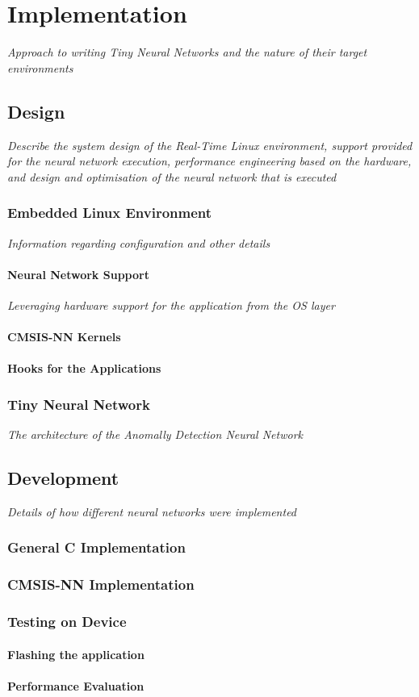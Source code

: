 \part{Implementation}

\textit{Approach to writing Tiny Neural Networks and the nature of their target environments}

\chapter{Design}
\textit{Describe the system design of the Real-Time Linux environment, support provided for the neural network execution, performance engineering based on the hardware, and design and optimisation of the neural network that is executed}

\section[Embedded Operating System]{Embedded Linux Environment}
\textit{Information regarding configuration and other details}

\subsection{Neural Network Support}
\textit{Leveraging hardware support for the application from the OS layer}

\subsection{CMSIS-NN Kernels}

\subsection{Hooks for the Applications}

\section{Tiny Neural Network}
\textit{The architecture of the Anomally Detection Neural Network}

\chapter{Development}
\textit{Details of how different neural networks were implemented}

\section{General C Implementation}

\section{CMSIS-NN Implementation}

\section{Testing on Device}

\subsection{Flashing the application}

\subsection{Performance Evaluation}
